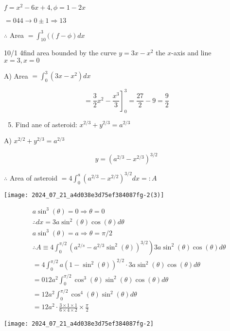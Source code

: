 \documentclass[12pt, a4paper]{article}
\begin{document}
$f=x^{2}-6 x+4, \phi=1-2 x$

$=044 \rightarrow 0 \pm 1 \Rightarrow 13$

$\therefore$ Area $=\int_{10}^{3}((f-\phi) d x$

10/1 4find area bounded by the curve $y=3 x-x^{2}$ the $x$-axis and line $x=3, x=0$

A) Area $=\int_{0}^{3}\left(3 x-x^{2}\right) d x$

$$
\left.=\frac{3}{2} x^{2}-\frac{x^{3}}{3}\right]_{0}^{3}=\frac{27}{2}-9=\frac{9}{2}
$$

\begin{enumerate}
  \setcounter{enumi}{4}
  \item Find ane of asteroid: $x^{2 / 3}+y^{2 / 3}=a^{2 / 3}$
\end{enumerate}

A) $x^{2 / 2}+y^{2 / 3}=a^{2 / 3}$

$$
y=\left(a^{2 / 3}-x^{2 / 3}\right)^{3 / 2}
$$

$\therefore$ Area of asteroid $=4 \int_{0}^{a}\left(a^{2 / 3}-x^{2 / 2}\right)^{3 / 2} d x=: A$

\begin{center}
\texttt{[image: 2024\_07\_21\_a4d038e3d75ef384087fg-2(3)]}
\end{center}

$$
\begin{aligned}
& a \sin ^{3}(\theta)=0 \Rightarrow \theta=0 \\
& \therefore d x=3 a \sin ^{2}(\theta) \cos (\theta) d \theta \\
& a \sin ^{3}(\theta)=a \Rightarrow \theta=\pi / 2 \\
& \left.\therefore A \equiv 4 \int_{0}^{\pi / 2}\left(a^{2 / s}-a^{2 / 3} \sin ^{2}(\theta)\right)^{3 / 2}\right) 3 a \sin ^{2}(\theta) \cos (\theta) d \theta \\
& =4 \int_{0}^{\pi / 2} a\left(1-\sin ^{2}(\theta)\right)^{2 / 2} \cdot 3 a \sin ^{2}(\theta) \cos (\theta) d \theta \\
& =012 a^{2} \int_{0}^{\pi / 2} \cos ^{3}(\theta) \sin ^{2}(\theta) \cos (\theta) d \theta \\
& =12 a^{2} \int_{0}^{\pi / 2} \cos ^{4}(\theta) \sin ^{2}(\theta) d \theta \\
& =12 a^{2} \cdot \frac{3 \times 1 \times 1}{6 \times 4 \times 2} \times \frac{\pi}{2}
\end{aligned}
$$

\begin{center}
\texttt{[image: 2024\_07\_21\_a4d038e3d75ef384087fg-2]}
\end{center}
\end{document}
